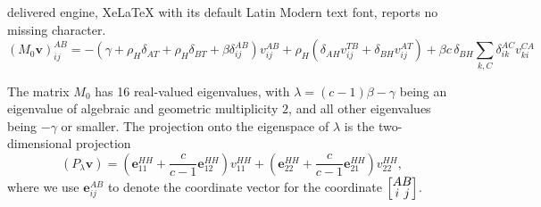 \documentclass[10pt,a4paper]{amsart}
\begin{document}
delivered engine, XeLaTeX with its default Latin Modern text font, reports no missing character.
\begin{equation}\label{M0-def}
(M_0 \mathbf v)_{ij}^{AB}=
 -\left(\gamma+\rho_H\delta_{AT}+\rho_H\delta_{BT}+\beta \delta_{ij}^{AB}\right)v_{ij}^{AB}
+\rho_H\left(\delta_{AH}v_{ij}^{T B}+\delta_{BH}v_{ij}^{AT}\right)
+\beta c \,\delta_{BH}\sum_{k,C}\delta_{ik}^{AC}v_{ki}^{CA}
\end{equation}

\begin{lemma}
\label{lem:matrix_eigenvalues}
The matrix $M_0$ has 16 real-valued eigenvalues, with   $\lambda=(c-1)\beta-\gamma$ being an eigenvalue of algebraic and geometric multiplicity $2$, and all other eigenvalues being $-\gamma$ or smaller.  The projection onto the eigenspace of $\lambda$ is the two-dimensional projection
  $$
  (P_\lambda\mathbf v)=
  \left(\mathbf e_{11}^{HH}+\frac c{c-1}\mathbf e_{12}^{HH}\right)v_{11}^{HH}+
 \left(\mathbf e_{22}^{HH}+\frac c{c-1}\mathbf e_{21}^{HH}\right)v_{22}^{HH},
  $$
  where  we use $\mathbf e_{ij}^{AB}$ to denote the coordinate vector for the coordinate 
\(
\renewcommand{\arraystretch}{0.7}
\left[
\begin{array}{@{}c@{}c@{}c@{}c@{}}
A & B\\
i & j
\end{array}
\right]
\).
\end{lemma}
\end{document}
